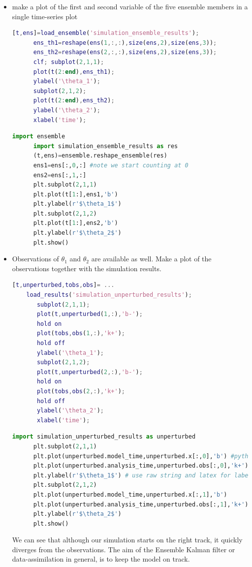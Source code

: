 \begin{itemize}
\begin{itemize}
      \item make a plot of the first and second variable of the five ensemble
      members in a single time-series plot
\ifshowmatlab
      \begin{lstlisting}[language=Matlab,frame=single,caption={Matlab}]
      [t,ens]=load_ensemble('simulation_ensemble_results');
      ens_th1=reshape(ens(1,:,:),size(ens,2),size(ens,3));
      ens_th2=reshape(ens(2,:,:),size(ens,2),size(ens,3));
      clf; subplot(2,1,1);
      plot(t(2:end),ens_th1);
      ylabel('\theta_1');
      subplot(2,1,2);
      plot(t(2:end),ens_th2);
      ylabel('\theta_2');
      xlabel('time');
      \end{lstlisting}
\fi
     
      \begin{lstlisting}[language=Python,frame=single,caption={Python}]
      import ensemble
      import simulation_ensemble_results as res
      (t,ens)=ensemble.reshape_ensemble(res)
      ens1=ens[:,0,:] #note we start counting at 0
      ens2=ens[:,1,:]
      plt.subplot(2,1,1)
      plt.plot(t[1:],ens1,'b')
      plt.ylabel(r'$\theta_1$')
      plt.subplot(2,1,2)
      plt.plot(t[1:],ens2,'b')
      plt.ylabel(r'$\theta_2$')
      plt.show()
      \end{lstlisting}
      
      \item Observations of $\theta_1$ and $\theta_2$ are available as well. Make a plot of
      the observations together with the simulation results.
\ifshowmatlab
      \begin{lstlisting}[language=Matlab,frame=single,caption={Matlab}]
	[t,unperturbed,tobs,obs]= ...
	load_results('simulation_unperturbed_results');
       subplot(2,1,1);
       plot(t,unperturbed(1,:),'b-');
       hold on
       plot(tobs,obs(1,:),'k+');
       hold off
       ylabel('\theta_1');
       subplot(2,1,2);
       plot(t,unperturbed(2,:),'b-');
       hold on
       plot(tobs,obs(2,:),'k+');
       hold off
       ylabel('\theta_2');
       xlabel('time');
      \end{lstlisting}
\fi
      \begin{lstlisting}[language=Python,frame=single,caption={Python}]
      import simulation_unperturbed_results as unperturbed
      plt.subplot(2,1,1)
      plt.plot(unperturbed.model_time,unperturbed.x[:,0],'b') #python counts starting at 0
      plt.plot(unperturbed.analysis_time,unperturbed.obs[:,0],'k+') #python counts starting at 0
      plt.ylabel(r'$\theta_1$') # use raw string and latex for label
      plt.subplot(2,1,2)
      plt.plot(unperturbed.model_time,unperturbed.x[:,1],'b')
      plt.plot(unperturbed.analysis_time,unperturbed.obs[:,1],'k+')
      plt.ylabel(r'$\theta_2$')
      plt.show()
      \end{lstlisting}
      
      We can see that although our simulation starts on the right track, it quickly diverges from the observations.
      The aim of the Ensemble Kalman filter or data-assimilation in general, is to keep the model on track. 
      \end{itemize}

\end{itemize}
